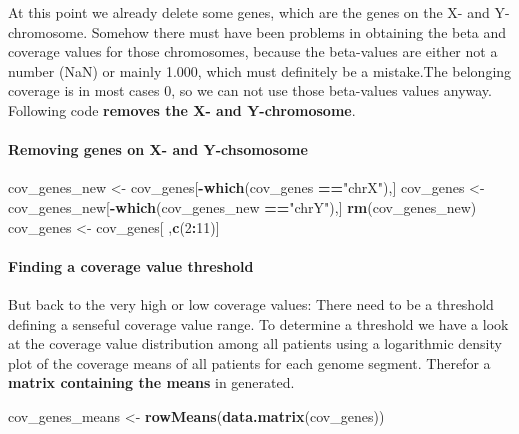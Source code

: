 \documentclass[]{article}
\newenvironment{Shaded}{\begin{snugshade}}{\end{snugshade}}
\newcommand{\KeywordTok}[1]{\textcolor[rgb]{0.13,0.29,0.53}{\textbf{#1}}}
\newcommand{\DecValTok}[1]{\textcolor[rgb]{0.00,0.00,0.81}{#1}}
\newcommand{\StringTok}[1]{\textcolor[rgb]{0.31,0.60,0.02}{#1}}
\newcommand{\OperatorTok}[1]{\textcolor[rgb]{0.81,0.36,0.00}{\textbf{#1}}}
\newcommand{\NormalTok}[1]{#1}
\let\oldparagraph\paragraph
\renewcommand{\paragraph}[1]{\oldparagraph{#1}\mbox{}}
\begin{document}
At this point we already delete some genes, which are the genes on the
X- and Y-chromosome. Somehow there must have been problems in obtaining
the beta and coverage values for those chromosomes, because the
beta-values are either not a number (NaN) or mainly 1.000, which must
definitely be a mistake.The belonging coverage is in most cases 0, so we
can not use those beta-values values anyway. Following code
\textbf{removes the X- and Y-chromosome}.

\paragraph{Removing genes on X- and
Y-chsomosome}\label{removing-genes-on-x--and-y-chsomosome}

\begin{Shaded}
\begin{Highlighting}[]
\NormalTok{cov_genes_new <-}\StringTok{ }\NormalTok{cov_genes[}\OperatorTok{-}\KeywordTok{which}\NormalTok{(cov_genes }\OperatorTok{==}\StringTok{"chrX"}\NormalTok{),]}
\NormalTok{cov_genes <-}\StringTok{ }\NormalTok{cov_genes_new[}\OperatorTok{-}\KeywordTok{which}\NormalTok{(cov_genes_new }\OperatorTok{==}\StringTok{"chrY"}\NormalTok{),]}
\KeywordTok{rm}\NormalTok{(cov_genes_new) }
\NormalTok{cov_genes <-}\StringTok{ }\NormalTok{cov_genes[ ,}\KeywordTok{c}\NormalTok{(}\DecValTok{2}\OperatorTok{:}\DecValTok{11}\NormalTok{)]}
\end{Highlighting}
\end{Shaded}

\paragraph{Finding a coverage value
threshold}\label{finding-a-coverage-value-threshold}

But back to the very high or low coverage values: There need to be a
threshold defining a senseful coverage value range. To determine a
threshold we have a look at the coverage value distribution among all
patients using a logarithmic density plot of the coverage means of all
patients for each genome segment. Therefor a \textbf{matrix containing
the means} in generated.

\begin{Shaded}
\begin{Highlighting}[]
\NormalTok{cov_genes_means <-}\StringTok{ }\KeywordTok{rowMeans}\NormalTok{(}\KeywordTok{data.matrix}\NormalTok{(cov_genes))}
\end{Highlighting}
\end{Shaded}
\end{document}
